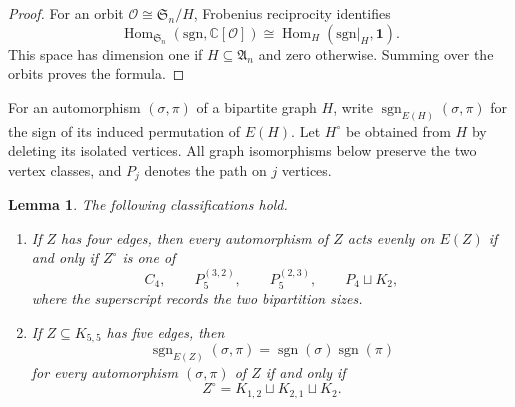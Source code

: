 \documentclass[11pt]{amsart}
\newtheorem{lemma}[theorem]{Lemma}
\newcommand{\C}{\mathbb C}
\newcommand{\signrep}{\mathrm{sgn}}
\DeclareMathOperator{\sgn}{sgn}
\begin{document}
\begin{proof}
For an orbit $\mathcal O\cong\mathfrak S_n/H$, Frobenius reciprocity
identifies
\[
  \operatorname{Hom}_{\mathfrak S_n}(\signrep,\C[\mathcal O])
  \cong
  \operatorname{Hom}_{H}(\signrep|_H,\mathbf1).
\]
This space has dimension one if $H\subseteq\mathfrak A_n$ and zero
otherwise. Summing over the orbits proves the formula.
\end{proof}

For an automorphism $(\sigma,\pi)$ of a bipartite graph $H$, write
$\sgn_{E(H)}(\sigma,\pi)$ for the sign of its induced permutation of
$E(H)$. Let $H^\circ$ be obtained from $H$ by deleting its isolated
vertices. All graph isomorphisms below preserve the two vertex classes,
and $P_j$ denotes the path on $j$ vertices.

\begin{lemma}\label{lem:small-graphs}
The following classifications hold.
\begin{enumerate}
\item If $Z$ has four edges, then every automorphism of $Z$ acts evenly
on $E(Z)$ if and only if $Z^\circ$ is one of
\[
  C_4,\qquad P_5^{(3,2)},\qquad P_5^{(2,3)},\qquad P_4\sqcup K_2,
\]
where the superscript records the two bipartition sizes.
\item If $Z\subseteq K_{5,5}$ has five edges, then
\begin{equation}\tag{$\ast$}\label{eq:five-edge-condition}
  \sgn_{E(Z)}(\sigma,\pi)=\sgn(\sigma)\sgn(\pi)
\end{equation}
for every automorphism $(\sigma,\pi)$ of $Z$ if and only if
\[
  Z^\circ=K_{1,2}\sqcup K_{2,1}\sqcup K_2.
\]
\end{enumerate}
\end{lemma}
\end{document}
